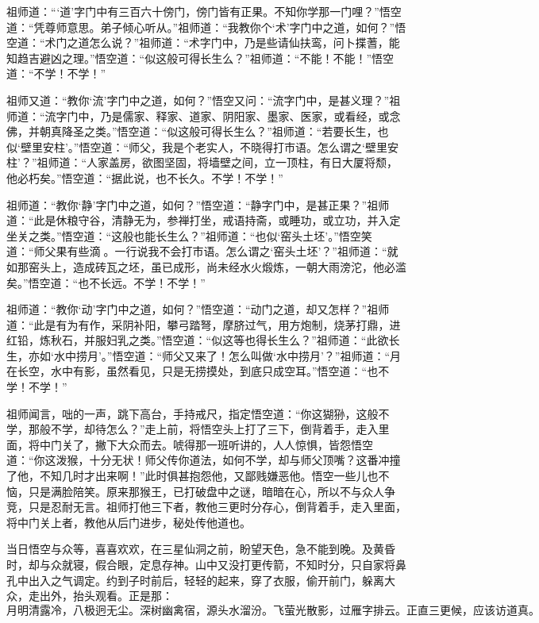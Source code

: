 \documentclass[12pt]{lsbook}
\begin{document}
祖师道：“‘道’字门中有三百六十傍门，傍门皆有正果。不知你学那一门哩？”悟空道：“凭尊师意思。弟子倾心听从。”祖师道：“我教你个‘术’字门中之道，如何？”悟空道：“术门之道怎么说？”祖师道：“术字门中，乃是些请仙扶鸾，问卜揲蓍，能知趋吉避凶之理。”悟空道：“似这般可得长生么？”祖师道：“不能！不能！”悟空道：“不学！不学！”

祖师又道：“教你‘流’字门中之道，如何？”悟空又问：“流字门中，是甚义理？”祖师道：“流字门中，乃是儒家、释家、道家、阴阳家、墨家、医家，或看经，或念佛，并朝真降圣之类。”悟空道：“似这般可得长生么？”祖师道：“若要长生，也似‘壁里安柱’。”悟空道：“师父，我是个老实人，不晓得打市语。怎么谓之‘壁里安柱’？”祖师道：“人家盖房，欲图坚固，将墙壁之间，立一顶柱，有日大厦将颓，他必朽矣。”悟空道：“据此说，也不长久。不学！不学！”

祖师道：“教你‘静’字门中之道，如何？”悟空道：“静字门中，是甚正果？”祖师道：“此是休粮守谷，清静无为，参禅打坐，戒语持斋，或睡功，或立功，并入定坐关之类。”悟空道：“这般也能长生么？”祖师道：“也似‘窑头土坯’。”悟空笑道：“师父果有些滴。一行说我不会打市语。怎么谓之‘窑头土坯’？”祖师道：“就如那窑头上，造成砖瓦之坯，虽已成形，尚未经水火煅炼，一朝大雨滂沱，他必滥矣。”悟空道：“也不长远。不学！不学！”

祖师道：“教你‘动’字门中之道，如何？”悟空道：“动门之道，却又怎样？”祖师道：“此是有为有作，采阴补阳，攀弓踏弩，摩脐过气，用方炮制，烧茅打鼎，进红铅，炼秋石，并服妇乳之类。”悟空道：“似这等也得长生么？”祖师道：“此欲长生，亦如‘水中捞月’。”悟空道：“师父又来了！怎么叫做‘水中捞月’？”祖师道：“月在长空，水中有影，虽然看见，只是无捞摸处，到底只成空耳。”悟空道：“也不学！不学！”

祖师闻言，咄的一声，跳下高台，手持戒尺，指定悟空道：“你这猢狲，这般不学，那般不学，却待怎么？”走上前，将悟空头上打了三下，倒背着手，走入里面，将中门关了，撇下大众而去。唬得那一班听讲的，人人惊惧，皆怨悟空道：“你这泼猴，十分无状！师父传你道法，如何不学，却与师父顶嘴？这番冲撞了他，不知几时才出来啊！”此时俱甚抱怨他，又鄙贱嫌恶他。悟空一些儿也不恼，只是满脸陪笑。原来那猴王，已打破盘中之谜，暗暗在心，所以不与众人争竞，只是忍耐无言。祖师打他三下者，教他三更时分存心，倒背着手，走入里面，将中门关上者，教他从后门进步，秘处传他道也。

当日悟空与众等，喜喜欢欢，在三星仙洞之前，盼望天色，急不能到晚。及黄昏时，却与众就寝，假合眼，定息存神。山中又没打更传箭，不知时分，只自家将鼻孔中出入之气调定。约到子时前后，轻轻的起来，穿了衣服，偷开前门，躲离大众，走出外，抬头观看。正是那：
\[
月明清露冷，八极迥无尘。深树幽禽宿，源头水溜汾。

飞萤光散影，过雁字排云。正直三更候，应该访道真。
\]
\end{document}
